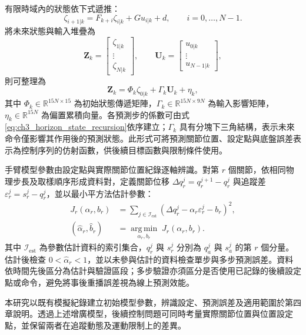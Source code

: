 有限時域內的狀態依下式遞推：
\begin{equation}
    \zeta_{i+1|k}
    =F_{k+i}\zeta_{i|k}+G u_{i|k}+d,
    \qquad i=0,\ldots,N-1.
    \label{eq:ch3_horizon_state_recursion}
\end{equation}
將未來狀態與輸入堆疊為
\begin{equation}
    \mathbf{Z}_k=
    \begin{bmatrix}
        \zeta_{1|k} \\ \vdots \\ \zeta_{N|k}
    \end{bmatrix},
    \qquad
    \mathbf{U}_k=
    \begin{bmatrix}
        u_{0|k} \\ \vdots \\ u_{N-1|k}
    \end{bmatrix},
    \label{eq:ch3_horizon_state_input_stack}
\end{equation}
則可整理為
\begin{equation}
    \mathbf{Z}_k
    =\Phi_k\zeta_{0|k}+\Gamma_k\mathbf{U}_k+\eta_k,
    \label{eq:ch3_condensed_augmented_prediction}
\end{equation}
其中 $\Phi_k\in\mathbb{R}^{15N\times15}$ 為初始狀態傳遞矩陣，$\Gamma_k\in\mathbb{R}^{15N\times9N}$ 為輸入影響矩陣，$\eta_k\in\mathbb{R}^{15N}$ 為偏置累積向量。各預測步的係數可由式\eqref{eq:ch3_horizon_state_recursion}依序建立；$\Gamma_k$ 具有分塊下三角結構，表示未來命令僅影響其作用後的預測狀態。此形式可將預測關節位置、設定點與底盤誤差表示為控制序列的仿射函數，供後續目標函數與限制條件使用。

手臂模型參數由設定點與實際關節位置紀錄逐軸辨識。對第 $r$ 個關節，依相同物理步長及取樣順序形成資料對，定義關節位移 $\Delta q_r^{j}=q_r^{j+1}-q_r^{j}$ 與追蹤差 $\varepsilon_r^{j}=s_r^{j}-q_r^{j}$，並以最小平方法估計參數：
\begin{equation}
    \begin{aligned}
        J_r(\alpha_r,b_r)
        &=\sum_{j\in\mathcal{I}_{\mathrm{est}}}
          \left(\Delta q_r^{j}-\alpha_r\varepsilon_r^{j}-b_r\right)^2, \\
        (\hat{\alpha}_r,\hat{b}_r)
        &=\underset{\alpha_r,b_r}{\operatorname{arg\,min}}\;
          J_r(\alpha_r,b_r).
    \end{aligned}
    \label{eq:ch3_arm_parameter_identification}
\end{equation}
其中 $\mathcal{I}_{\mathrm{est}}$ 為參數估計資料的索引集合，$q_r^{j}$ 與 $s_r^{j}$ 分別為 $q_a^{j}$ 與 $s_a^{j}$ 的第 $r$ 個分量。估計後檢查 $0<\hat{\alpha}_r<1$，並以未參與估計的資料檢查單步與多步預測誤差。資料依時間先後區分為估計與驗證區段；多步驗證亦須區分是否使用已記錄的後續設定點或命令，避免將事後重播誤差視為線上預測效能。

本研究以既有模擬紀錄建立初始模型參數，辨識設定、預測誤差及適用範圍於第四章說明。透過上述增廣模型，後續控制問題可同時考量實際關節位置與位置設定點，並保留兩者在追蹤動態及運動限制上的差異。
